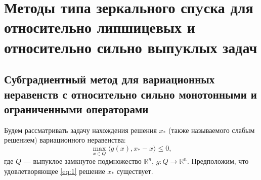 \chapter{Методы типа зеркального спyска для относительно липшицевых и относительно сильно выпyклых задач}\label{ch:ch2}

\section{Субградиентный метод для вариационных неравенств с относительно сильно монотонными и ограниченными операторами}\label{sec:ch2/sec1}

    Будем рассматривать задачу нахождения решения $x_*$ (также называемого слабым решением) вариационного неравенства: 
    \begin{equation}\label{eq:1}
        \max_{x \in Q} \langle g(x), x_* - x \rangle \leq 0,
    \end{equation}
    где $Q$ --- выпуклое замкнутое подмножество $\mathbb{R}^n$,
    $g: Q \longrightarrow \mathbb{R}^n$. Предположим, что удовлетворяющее \eqref{eq:1} решение $x_*$ существует.

